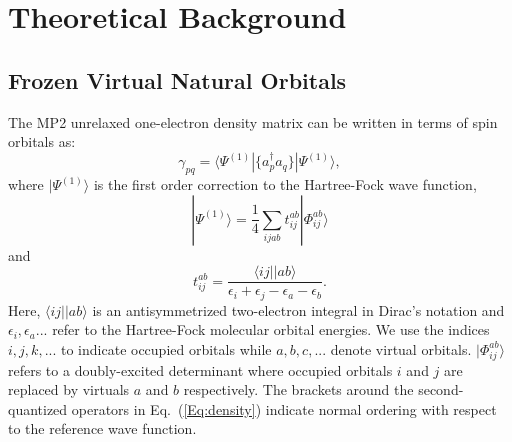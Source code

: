\documentclass[11pt,article]{achemso}
\begin{document}
\section{Theoretical Background}

\subsection{Frozen Virtual Natural Orbitals}

The MP2 unrelaxed one-electron density matrix can be written in terms of
spin orbitals as: 
\begin{equation}
\gamma_{pq} = \langle \Psi^{(1)}|\{ a^{\dagger}_{p}a_q\}|\Psi^{(1)}\rangle,
\label{Eq:density}
\end{equation}
where $|\Psi^{(1)}\rangle$ is the first order correction to the Hartree-Fock
wave function,
\begin{equation}
|\Psi^{(1)}\rangle = \frac{1}{4}\sum_{ijab} t^{ab}_{ij}|\Phi^{ab}_{ij}\rangle
\end{equation}
and
\begin{equation}
t^{ab}_{ij} = \frac{\langle ij||ab\rangle}{\epsilon_i + \epsilon_j -
\epsilon_a - \epsilon_b}.
\end{equation}
Here, $\langle ij||ab\rangle$ is an antisymmetrized two-electron integral in
Dirac's notation and $\epsilon_i,\epsilon_a...$ refer to the Hartree-Fock
molecular orbital energies. We use the indices $i,j,k,...$ to indicate occupied
orbitals while $a,b,c,...$ denote virtual orbitals. $|\Phi^{ab}_{ij}\rangle$
refers to a doubly-excited determinant where occupied orbitals $i$ and $j$ are
replaced by virtuals $a$ and $b$ respectively.  The brackets around the
second-quantized operators in Eq.~(\ref{Eq:density}) indicate normal ordering
with respect to the reference wave function.
\end{document}
